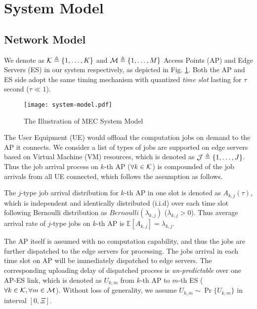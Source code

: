 \section{System Model}
\subsection{Network Model}
We denote as $\mathcal{K} \triangleq \{1,\dots,K\}$ and $\mathcal{M} \triangleq \{1,\dots,M\}$ Access Points (AP) and Edge Servers (ES) in our system respectively, as depicted in Fig. \ref{fig:system}.
Both the AP and ES side adopt the same timing mechanism with quantized \emph{time slot} lasting for $\tau$ second ($\tau \ll 1$).

\begin{figure}[ht]
    \centering
    \texttt{[image: system-model.pdf]}
    \caption{The Illustration of MEC System Model}
    \label{fig:system}
\end{figure}

The User Equipment (UE) would offload the computation jobs on demand to the AP it connects.
We consider a list of types of jobs are supported on edge servers based on Virtual Machine (VM) resources, which is denoted as $\mathcal{J} \triangleq \{1,\dots, J\}$.
Thus the job arrival process on $k$-th AP ($\forall k\in\mathcal{K}$) is compounded of the job arrivals from all UE connected, which follows the assumption as follows.
\begin{assumption}
    The $j$-type job arrival distribution for $k$-th AP in one slot is denoted as $A_{k,j}(\tau)$, which is independent and identically distributed (i.i.d) over each time slot following Bernoulli distribution as $Bernoulli(\lambda_{k,j})$ ($\lambda_{k,j} > 0$).
    Thus average arrival rate of $j$-type jobs on $k$-th AP is $\mathbb{E}[A_{k,j}]=\lambda_{k,j}$.
\end{assumption}

The AP itself is assumed with no computation capability, and thus the jobs are further dispatched to the edge servers for processing.
The jobs arrival in each time slot on AP will be immediately dispatched to edge servers.
The corresponding uploading delay of dispatched process is \emph{un-predictable} over one AP-ES link, which is denoted as $U_{k,m}$ from $k$-th AP to $m$-th ES ($\forall k\in\mathcal{K}, \forall m\in\mathcal{M}$).
Without loss of generality, we assume $U_{k,m} \sim \Pr\{U_{k,m}\}$ in interval $[0, \Xi]$.

